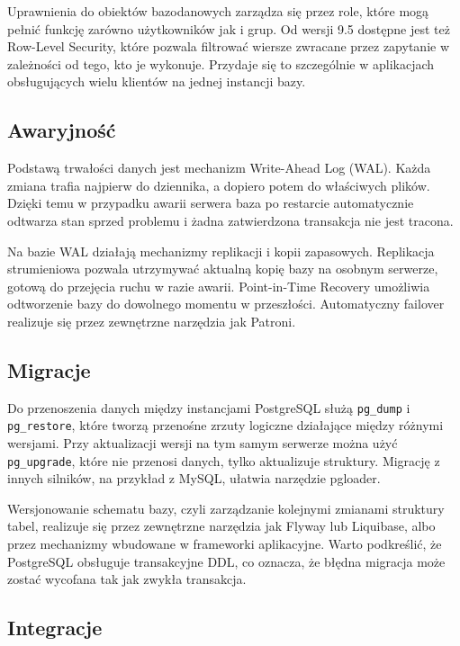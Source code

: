Uprawnienia do obiektów bazodanowych zarządza się przez role, które mogą
pełnić funkcję zarówno użytkowników jak i grup. Od wersji 9.5 dostępne jest
też Row-Level Security, które pozwala filtrować wiersze zwracane przez zapytanie
w zależności od tego, kto je wykonuje. Przydaje się to szczególnie w aplikacjach
obsługujących wielu klientów na jednej instancji bazy.

\subsection{Awaryjność}

Podstawą trwałości danych jest mechanizm Write-Ahead Log (WAL). Każda zmiana
trafia najpierw do dziennika, a dopiero potem do właściwych plików. Dzięki temu
w przypadku awarii serwera baza po restarcie automatycznie odtwarza stan sprzed
problemu i żadna zatwierdzona transakcja nie jest tracona.

Na bazie WAL działają mechanizmy replikacji i kopii zapasowych. Replikacja
strumieniowa pozwala utrzymywać aktualną kopię bazy na osobnym serwerze,
gotową do przejęcia ruchu w razie awarii. Point-in-Time Recovery umożliwia
odtworzenie bazy do dowolnego momentu w przeszłości. Automatyczny failover
realizuje się przez zewnętrzne narzędzia jak Patroni.

\subsection{Migracje}

Do przenoszenia danych między instancjami PostgreSQL służą \texttt{pg\_dump}
i \texttt{pg\_restore}, które tworzą przenośne zrzuty logiczne działające między
różnymi wersjami. Przy aktualizacji wersji na tym samym serwerze można użyć
\texttt{pg\_upgrade}, które nie przenosi danych, tylko aktualizuje struktury.
Migrację z innych silników, na przykład z MySQL, ułatwia narzędzie pgloader.

Wersjonowanie schematu bazy, czyli zarządzanie kolejnymi zmianami struktury
tabel, realizuje się przez zewnętrzne narzędzia jak Flyway lub Liquibase, albo
przez mechanizmy wbudowane w frameworki aplikacyjne. Warto podkreślić, że
PostgreSQL obsługuje transakcyjne DDL, co oznacza, że błędna migracja może
zostać wycofana tak jak zwykła transakcja.

\subsection{Integracje}

